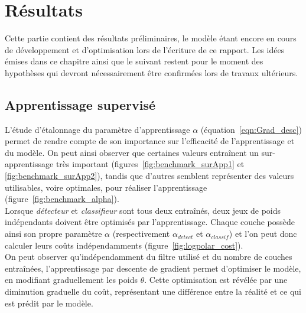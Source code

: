 
\chapter{Résultats} %
 
\label{Résultats} %


Cette partie contient des résultats préliminaires, le modèle étant encore en cours de développement et d'optimisation lors de l'écriture de ce rapport. Les idées émises dans ce chapitre ainsi que le suivant restent pour le moment des hypothèses qui devront nécessairement être confirmées lors de travaux ultérieurs. \\

\section{Apprentissage supervisé}

L'étude d'étalonnage du paramètre d'apprentissage $\alpha$ (équation~\ref{eqn:Grad_desc}) permet de rendre compte de son importance sur l'efficacité de l'apprentissage et du modèle. On peut ainsi observer que certaines valeurs entraînent un sur-apprentissage très important (figures~\ref{fig:benchmark_surApp1} et \ref{fig:benchmark_surApp2}), tandis que d'autres semblent représenter des valeurs utilisables, voire optimales, pour réaliser l'apprentissage (figure~\ref{fig:benchmark_alpha}).\\
Lorsque \textit{détecteur} et \textit{classifieur} sont tous deux entraînés, deux jeux de poids indépendants doivent être optimisés par l'apprentissage. Chaque couche possède ainsi son propre paramètre $\alpha$ (respectivement $\alpha_{detect}$ et $\alpha_{classif}$) et l'on peut donc calculer leurs coûts indépendamments (figure~\ref{fig:logpolar_cost}).\\
On peut observer qu'indépendamment du filtre utilisé et du nombre de couches entraînées, l'apprentissage par descente de gradient permet d'optimiser le modèle, en modifiant graduellement les poids $\theta$. Cette optimisation est révélée par une diminution graduelle du coût, représentant une différence entre la réalité et ce qui est prédit par le modèle.


